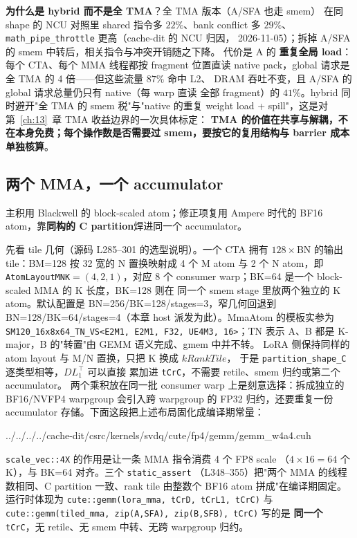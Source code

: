 \textbf{为什么是 hybrid 而不是全 TMA}？全 TMA 版本（A/SFA 也走 smem）
在同 shape 的 NCU 对照里 shared 指令多 $22\%$、bank conflict 多
$29\%$、\texttt{math\_pipe\_throttle} 更高（cache-dit 的 NCU 归因，
2026-11-05）；拆掉 A/SFA 的 smem 中转后，相关指令与冲突开销随之下降。
代价是 A 的
\textbf{重复全局 load}：每个 CTA、每个 MMA 线程都按 fragment 位置直读
native pack，global 请求是全 TMA 的 4 倍——但这些流量 $87\%$ 命中 L2、
DRAM 吞吐不变，且 A/SFA 的 global 请求总量仍只有 native（每 warp 直读
全部 fragment）的 $41\%$。hybrid 同时避开"全 TMA 的 smem 税"与"native 的重复 weight
load + spill"，这是对第~\ref{ch:13}~章 TMA 收益边界的一次具体标定：
\textbf{TMA 的价值在共享与解耦，不在本身免费；每个操作数是否需要过
smem，要按它的复用结构与 barrier 成本单独核算}。

\subsection{两个 MMA，一个 accumulator}\label{sec:40-mma}

主积用 Blackwell 的 block-scaled atom；修正项复用 Ampere 时代的
BF16 atom，靠\textbf{同构的 C partition}焊进同一个 accumulator。

先看 tile 几何（源码 L285--301 的选型说明）。一个 CTA 拥有
$128\times$BN 的输出 tile：BM=128 按 32 宽的 N 置换映射成 4 个 M atom
与 2 个 N atom，即 \texttt{AtomLayoutMNK}$=(4,2,1)$，对应 8 个
consumer warp；BK=64 是一个 block-scaled MMA 的 K 长度，BK=128 则在
同一个 smem stage 里放两个独立的 K atom。默认配置是
BN=256/BK=128/stages=3，窄几何回退到 BN=128/BK=64/stages=4（本章 host
派发为此）。MmaAtom 的模板实参为
\texttt{SM120\_16x8x64\_TN\_VS<E2M1, E2M1, F32, UE4M3, 16>}；TN 表示
A、B 都是 K-major，B 的"转置"由 GEMM 语义完成、gmem 中并不转。
LoRA 侧保持同样的 atom layout 与 M/N 置换，只把 K 换成 $kRankTile$，
于是 \texttt{partition\_shape\_C} 逐类型相等，$DL_1^{\top}$ 可以直接
累加进 \texttt{tCrC}，不需要 retile、smem 归约或第二个 accumulator。
两个乘积放在同一批 consumer warp 上是刻意选择：拆成独立的
BF16/NVFP4 warpgroup 会引入跨 warpgroup 的 FP32 归约，还要重复一份
accumulator 存储。下面这段把上述布局固化成编译期常量：

\begin{lstinputlisting}[linerange={332-355},firstnumber=auto,
  title={gemm\_w4a4.cuh L332-355（NVFP4 TiledMMA、LoRA TiledMMA 与一致性 static\_assert）}]{../../../../cache-dit/csrc/kernels/svdq/cute/fp4/gemm/gemm_w4a4.cuh}
\end{lstinputlisting}

\texttt{scale\_vec::4X} 的作用是让一条 MMA 指令消费 4 个 FP8 scale
（$4\times16=64$ 个 K），与 BK=64 对齐。三个 \texttt{static\_assert}
（L348--355）把"两个 MMA 的线程数相同、C partition 一致、rank tile 由整数个
BF16 atom 拼成"在编译期固定。运行时体现为
\texttt{cute::gemm(lora\_mma, tCrD, tCrL1, tCrC)} 与
\texttt{cute::gemm(tiled\_mma, zip(A,SFA), zip(B,SFB), tCrC)} 写的是
\textbf{同一个} \texttt{tCrC}，无 retile、无 smem 中转、无跨
warpgroup 归约。


